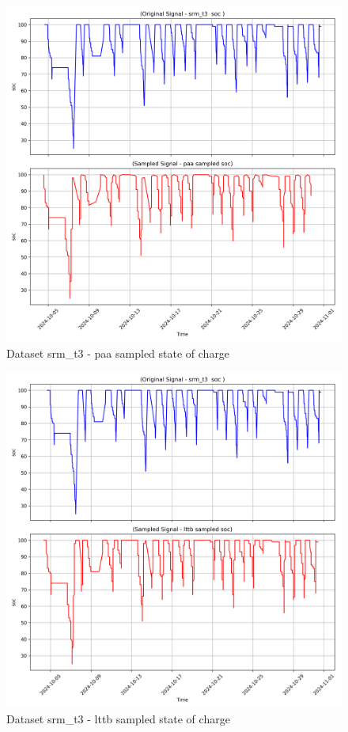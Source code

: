\begin{figure}
    \centering
    \includegraphics[width=1\linewidth]{screenshots/srm_t3/paa_sampled_soc_screenshot.png}
    \caption{Dataset srm\_t3 - paa sampled state of charge }
    \label{fig:srm_t3_paa_sampled_soc_screenshot}
\end{figure}
\begin{figure}
    \centering
    \includegraphics[width=1\linewidth]{screenshots/srm_t3/lttb_sampled_soc_screenshot.png}
    \caption{Dataset srm\_t3 - lttb sampled state of charge }
    \label{fig:srm_t3_lttb_sampled_soc_screenshot}
\end{figure}
